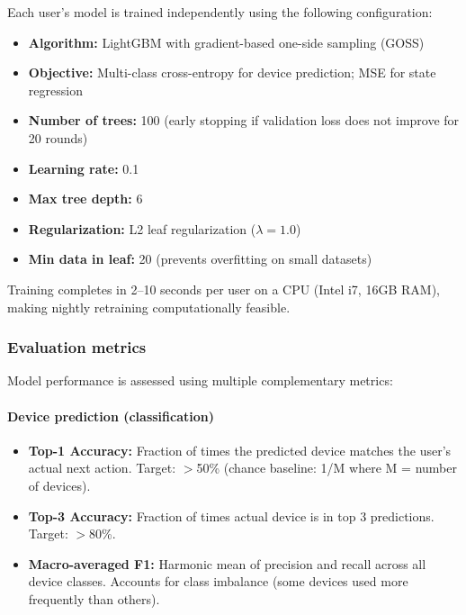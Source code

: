 Each user's model is trained independently using the following configuration:

\begin{itemize}
    \item \textbf{Algorithm:} LightGBM with gradient-based one-side sampling (GOSS)
    \item \textbf{Objective:} Multi-class cross-entropy for device prediction; MSE for state regression
    \item \textbf{Number of trees:} 100 (early stopping if validation loss does not improve for 20 rounds)
    \item \textbf{Learning rate:} 0.1
    \item \textbf{Max tree depth:} 6
    \item \textbf{Regularization:} L2 leaf regularization ($\lambda = 1.0$)
    \item \textbf{Min data in leaf:} 20 (prevents overfitting on small datasets)
\end{itemize}

Training completes in 2--10 seconds per user on a CPU (Intel i7, 16GB RAM), making nightly retraining computationally feasible.

\subsubsection{Evaluation metrics}

Model performance is assessed using multiple complementary metrics:

\paragraph{Device prediction (classification)}
\begin{itemize}
    \item \textbf{Top-1 Accuracy:} Fraction of times the predicted device matches the user's actual next action. Target: $>$50\% (chance baseline: 1/M where M = number of devices).
    
    \item \textbf{Top-3 Accuracy:} Fraction of times actual device is in top 3 predictions. Target: $>$80\%.
    
    \item \textbf{Macro-averaged F1:} Harmonic mean of precision and recall across all device classes. Accounts for class imbalance (some devices used more frequently than others).
\end{itemize}

